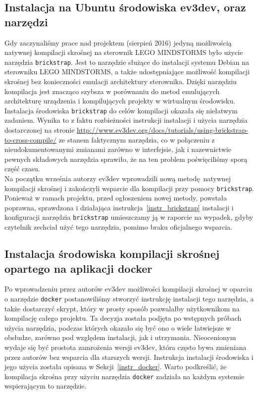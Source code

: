 \documentclass{article}
\begin{document}
\subsection{Instalacja na Ubuntu środowiska ev3dev, oraz narzędzi}
Gdy zaczynaliśmy prace nad projektem (sierpień 2016) jedyną możliwością natywnej
kompilacji skrośnej na sterownik LEGO MINDSTORMS było użycie narzędzia
\texttt{brickstrap}. Jest to narzędzie służące do instalacji systemu Debian na
sterowniku LEGO MINDSTORMS, a także udostępniające możliwość kompilacji skrośnej
bez konieczności emulacji architektury sterownika. Dzięki narzędziu kompilacja
jest znacząco szybsza w porównaniu do metod emulujących architekturę urządzenia
i kompilujących projekty w wirtualnym środowisku.\\
Instalacja środowiska \texttt{brickstrap} do celów kompilacji okazała się
niełatwym zadaniem. Wynika to z faktu rozbieżności instrukcji instalacji i
użycia narzędzia dostarczonej na stronie\newline
\url{http://www.ev3dev.org/docs/tutorials/using-brickstrap-to-cross-compile/} ze
stanem faktycznym narzędzia, co w połączeniu z nieudokumentowanymi zmianami
zarówno w interfejsie, jak i nazewnictwie pewnych składowych narzędzia
sprawiło, że na ten problem poświęciliśmy sporą część czasu.\\
Na początku września autorzy ev3dev wprowadzili nową metodę natywnej kompilacji
skrośnej i zakończyli wsparcie dla kompilacji przy pomocy \texttt{brickstrap}.
Ponieważ w ramach projektu, przed ogłoszeniem nowej metody, powstała poprawna,
sprawdzona i działająca instrukcja~\ref{instr_brickstrap}
instalacji i konfiguracji narzędzia \texttt{brickstrap} umieszczamy ją w
raporcie na wypadek, gdyby czytelnik zechciał użyć tego narzędzia, pomimo braku
oficjalnego wsparcia.
\subsection{Instalacja środowiska kompilacji skrośnej opartego na aplikacji
    docker}
Po wprowadzeniu przez autorów ev3dev możliwości kompilacji skrośnej w oparciu o
narzędzie \texttt{docker} postanowiliśmy stworzyć instrukcję instalacji tego
narzędzia, a także dostarczyć skrypt, który w prosty sposób pozwalałby
użytkownikom na kompilację całego projektu. Ta decyzja została podjęta po
wstępnych próbach użycia narzędzia, podczas których okazało się być ono o wiele
łatwiejsze w obsłudze, zarówno pod względem instalacji, jak i utrzymania.
Nieocenionym wydaje się być prostota zamrożenia wersji ev3dev, która często bywa
zmieniana przez autorów bez wsparcia dla starszych wersji. Instrukcja instalacji
środowiska i jego użycia została opisana w Sekcji~\ref{instr_docker}. Warto
podkreślić, że kompilacja skrośna przy użyciu narzędzia \texttt{docker} zadziała
na każdym systemie wspierającym to narzędzie.
\end{document}
